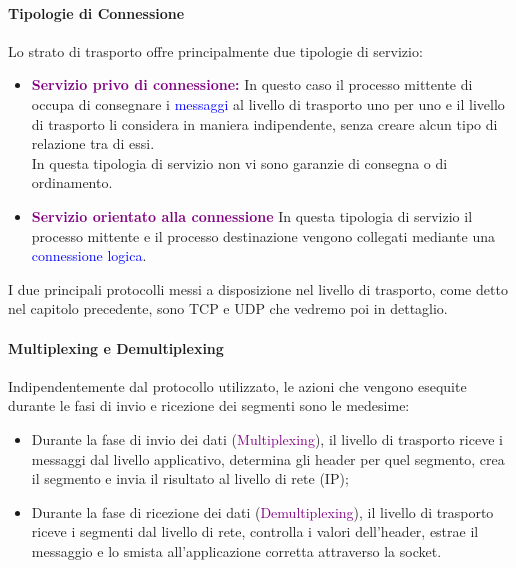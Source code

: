 \newpage

\paragraph{Tipologie di Connessione}
Lo strato di trasporto offre principalmente due tipologie di servizio:
\begin{itemize}
    \item \textbf{\textcolor{purple}{Servizio privo di connessione:}} In questo caso il processo mittente di occupa di consegnare i \textcolor{blue}{messaggi} al livello di trasporto uno per uno e il livello di trasporto li considera in maniera indipendente, senza creare alcun tipo di relazione tra di essi. 
    \\In questa tipologia di servizio non vi sono garanzie di consegna o di ordinamento.
    \item \textbf{\textcolor{purple}{Servizio orientato alla connessione}} In questa tipologia di servizio il processo mittente e il processo destinazione vengono collegati mediante una \textcolor{blue}{connessione logica}.
\end{itemize}

I due principali protocolli messi a disposizione nel livello di trasporto, come detto nel capitolo precedente, sono TCP e UDP che vedremo poi in dettaglio.

\paragraph{Multiplexing e Demultiplexing}
Indipendentemente dal protocollo utilizzato, le azioni che vengono esequite durante le fasi di invio e ricezione dei segmenti sono le medesime:
\begin{itemize}
    \item Durante la fase di invio dei dati (\textcolor{purple}{Multiplexing}), il livello di trasporto riceve i messaggi dal livello applicativo, determina gli header per quel segmento, crea il segmento e invia il risultato al livello di rete (IP);
    \item Durante la fase di ricezione dei dati (\textcolor{purple}{Demultiplexing}), il livello di trasporto riceve i segmenti dal livello di rete, controlla i valori dell'header, estrae il messaggio e lo smista all'applicazione corretta attraverso la socket.
\end{itemize}

